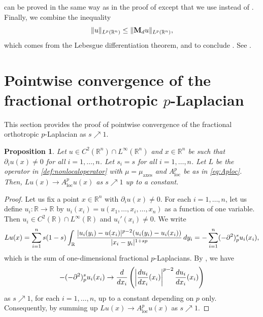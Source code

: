 \documentclass[11pt]{amsart}
\theoremstyle{plain}
\newtheorem{proposition}[theorem]{Proposition}
\theoremstyle{definition}
\numberwithin{equation}{section}
\renewcommand{\d}{\textnormal{d}}
\newcommand{\ma}{\mu_{\mathrm{axes}}}
\begin{document}
\begin{appendix}
 can be proved in the same way as in the proof of \cite[Theorem 3.4.5]{GrafakosMF} except that we use  instead of \cite[Theorem 3.4.4]{GrafakosMF}. Finally, we combine the inequality
\begin{equation*}
\|u\|_{L^p(\mathbb{R}^n)} \leq \|{\bf M}_du\|_{L^p(\mathbb{R}^n)},
\end{equation*}
which comes from the Lebesgue differentiation theorem, and  to conclude . See \cite[Corollary 3.4.6]{GrafakosMF}.

\section{Pointwise convergence of the fractional orthotropic \texorpdfstring{$p$}{p}-Laplacian}

This section provides the proof of pointwise convergence of the fractional orthotropic $p$-Laplacian as $s \nearrow 1$.

\begin{proposition} \label{prop:convergence}
Let $u \in C^2(\mathbb{R}^n) \cap L^{\infty}(\mathbb{R}^n)$ and $x \in \mathbb{R}^n$ be such that $\partial_iu(x) \neq 0$ for all $i = 1, \dots, n$. Let $s_i = s$ for all $i=1, \dots, n$. Let $L$ be the operator in \eqref{def:nonlocaloperator} with $\mu = \ma$ and $A^{p}_{\mathrm{loc}}$ be as in \eqref{eq:Aploc}. Then, $Lu(x) \to A^{p}_{\mathrm{loc}}u(x)$ as $s \nearrow 1$ up to a constant.
\end{proposition}

\begin{proof}
Let us fix a point $x \in \mathbb{R}^n$ with $\partial_iu(x) \neq 0$. For each $i = 1, \dots, n$, let us define $u_i : \mathbb{R} \to \mathbb{R}$ by $u_i(x_i) = u(x_1, \dots, x_i, \dots, x_n)$ as a function of one variable. Then $u_i \in C^2(\mathbb{R}) \cap L^{\infty}(\mathbb{R})$ and $u_i'(x_i) \neq 0$. We write
\begin{equation*}
\begin{split}
Lu(x) = \sum_{i=1}^{n} s(1-s) \int_{\mathbb{R}} \frac{|u_i(y_i) - u(x_i)|^{p-2} (u_i(y_i) - u_i(x_i))}{|x_i-y_i|^{1+sp}} \,\d y_i = - \sum_{i=1}^n (-\partial^2)^{s}_{p} u_i(x_i),
\end{split}
\end{equation*}
which is the sum of one-dimensional fractional $p$-Laplacians. By \cite[Theorem 2.8]{BucSqu21}, we have
\begin{equation*}
-(-\partial^2)^{s}_{p} u_i(x_i) \to \frac{\d}{\d x_i} \left( \left| \frac{\d u_i}{\d x_i}(x_i) \right|^{p-2} \frac{\d u_i}{\d x_i}(x_i) \right)
\end{equation*}
as $s \nearrow 1$, for each $i=1, \dots, n$, up to a constant depending on $p$ only. Consequently, by summing up $Lu(x) \to A^{p}_{\mathrm{loc}}u(x)$ as $s \nearrow 1$.
\end{proof}

 
\end{appendix}
\end{document}
